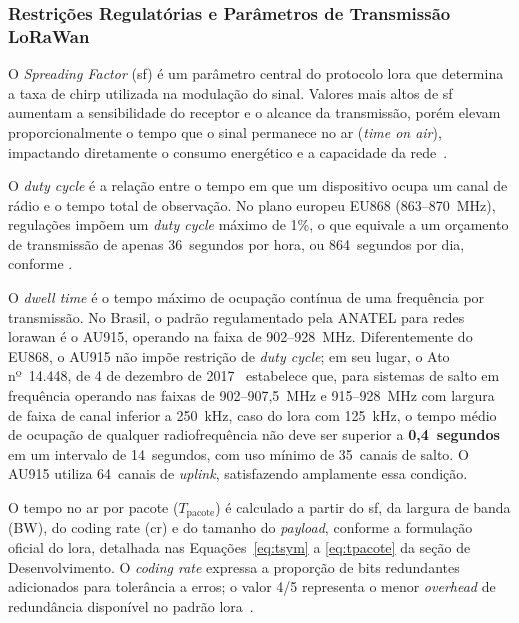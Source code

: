 
\subsubsection{Restrições Regulatórias e Parâmetros de Transmissão LoRaWan}

O \textit{Spreading Factor} (\gls{sf}) é um parâmetro central do protocolo 
\gls{lora} que determina a taxa de chirp utilizada na modulação do sinal. 
Valores mais altos de \gls{sf} aumentam a sensibilidade do receptor e o 
alcance da transmissão, porém elevam proporcionalmente o tempo que o 
sinal permanece no ar (\textit{time on air}), impactando diretamente 
o consumo energético e a capacidade da rede~\cite{adam2022}.

O \textit{duty cycle} é a relação entre o tempo em que um dispositivo 
ocupa um canal de rádio e o tempo total de observação. No plano europeu 
EU868 (863--870~MHz), regulações impõem um \textit{duty cycle} máximo 
de 1\%, o que equivale a um orçamento de transmissão de apenas 
36~segundos por hora, ou 864~segundos por dia, conforme 
.

O \textit{dwell time} é o tempo máximo de ocupação contínua de uma 
frequência por transmissão. No Brasil, o padrão regulamentado pela 
ANATEL para redes \gls{lorawan} é o AU915, operando na faixa de 
902--928~MHz. Diferentemente do EU868, o AU915 não impõe restrição 
de \textit{duty cycle}; em seu lugar, o Ato nº~14.448, de 4 de dezembro 
de 2017~\cite{anatel2017} estabelece que, para sistemas de salto em 
frequência operando nas faixas de 902--907,5~MHz e 915--928~MHz com 
largura de faixa de canal inferior a 250~kHz, caso do \gls{lora} com 
125~kHz, o tempo médio de ocupação de qualquer radiofrequência não 
deve ser superior a \textbf{0,4~segundos} em um intervalo de 
14~segundos, com uso mínimo de 35~canais de salto. O AU915 utiliza 
64~canais de \textit{uplink}, satisfazendo amplamente essa condição.

O tempo no ar por pacote ($T_{\text{pacote}}$) é calculado a partir 
do \gls{sf}, da largura de banda (BW), do coding rate (\gls{cr}) e do 
tamanho do \textit{\gls{payload}}, conforme a formulação oficial do \gls{lora}, 
detalhada nas Equações~\ref{eq:tsym} a \ref{eq:tpacote} da seção de 
Desenvolvimento. O \textit{coding rate} expressa a proporção de bits 
redundantes adicionados para tolerância a erros; o valor 4/5 representa 
o menor \textit{overhead} de redundância disponível no padrão 
\gls{lora}~\cite{adam2022}.

